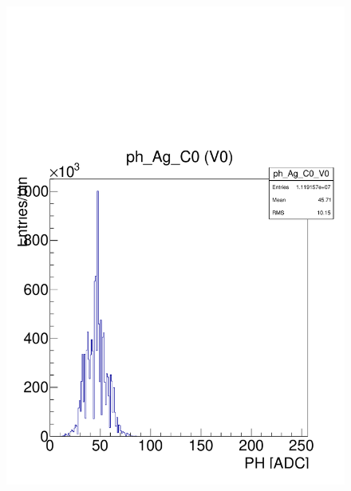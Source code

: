 \documentclass[a4paper,12pt,twoside]{article}
\begin{document}
\begin{figure} [h!]
\begin{minipage}{.48\textwidth}
  \includegraphics[width=\textwidth]{./HRData_ph_histo.pdf}
  \label{HRData-PHHisto}
\end{minipage}
\end{figure}
\end{document}
